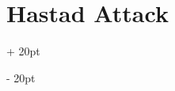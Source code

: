 \documentclass[a4paper, 12pt, twoside]{article}
\newcommand{\nset}[2]{\left\llbracket #1\ ;\ #2 \right\rrbracket}
\renewcommand{\ge}{\geqslant}
\newcommand{\ind}[1][20pt]{\advance\leftskip + #1}
\newcommand{\deind}[1][20pt]{\advance\leftskip - #1}
\newenvironment{indt}[2][20pt]{#2 \par \ind[#1]}{\par \deind} %
\begin{document}
\begin{indt}{\section{Hastad Attack}}



        








\end{indt}
\end{document}
